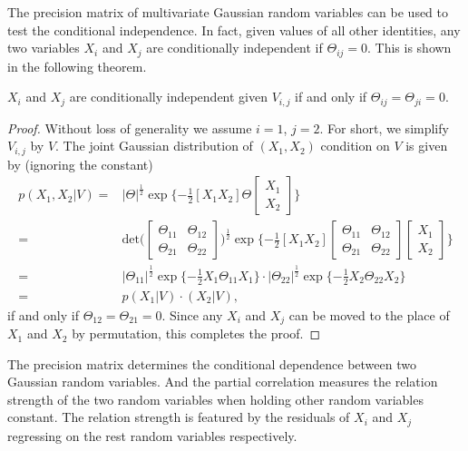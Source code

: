 The precision matrix of multivariate Gaussian random variables can be used to test the conditional independence. 
In fact, given values of all other identities, 
any two variables $X_i$ and $X_j$ are conditionally independent if $\Theta_{ij}=0$. 
This is shown in the following theorem.
\begin{theorem}
    \label{thm: ch1_conind}
    $X_i$ and $X_j$ are conditionally independent given $V_{i,j}$ if and only if $\Theta_{ij}=\Theta_{ji}=0$.
\end{theorem}
\begin{proof}
    Without loss of generality we assume $i=1$, $j=2$. For short, we simplify $V_{i,j}$ by $V$.
    The joint Gaussian distribution of $(X_1, X_2)$ condition on $V$ is given by (ignoring the constant) 
    \begin{align*}
        p(X_1,X_2|V)=&|\Theta|^{\frac{1}{2}}\exp\{-\frac{1}{2}[X_1 X_2]\Theta\begin{bmatrix}
            X_1 \\
            X_2 
        \end{bmatrix}\}\\
        =& \text{det}\bigg(\begin{bmatrix}
            \Theta_{11} & \Theta_{12} \\
            \Theta_{21} & \Theta_{22} 
        \end{bmatrix}\bigg)^{\frac{1}{2}}\exp\{-\frac{1}{2}[X_1 X_2]\begin{bmatrix}
            \Theta_{11} & \Theta_{12} \\
            \Theta_{21} & \Theta_{22}
        \end{bmatrix}\begin{bmatrix}
            X_1 \\
            X_2
        \end{bmatrix}\} \\
        =& |\Theta_{11}|^{\frac{1}{2}}\exp\{-\frac{1}{2}X_1\Theta_{11}X_1\}\cdot|\Theta_{22}|^{\frac{1}{2}}\exp\{-\frac{1}{2}X_2\Theta_{22}X_2\} \\
        =& p(X_1|V)\cdotp(X_2|V),
    \end{align*}
    if and only if $\Theta_{12}=\Theta_{21}=0$. Since any $X_i$ and $X_j$ can be moved to the place of $X_1$ and $X_2$ by permutation, this completes the proof. 
\end{proof}

The precision matrix determines the conditional dependence between two Gaussian random variables. 
And the partial correlation measures the relation strength of the two random variables when holding other random variables constant. 
The relation strength is featured by the residuals of $X_i$ and $X_j$ regressing on the rest random variables respectively. 

